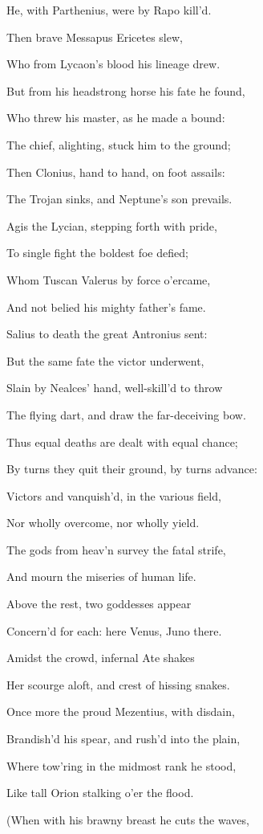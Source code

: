 He, with Parthenius, were by Rapo kill’d.

Then brave Messapus Ericetes slew,

Who from Lycaon’s blood his lineage drew.

But from his headstrong horse his fate he found,

Who threw his master, as he made a bound:

The chief, alighting, stuck him to the ground;

Then Clonius, hand to hand, on foot assails:

The Trojan sinks, and Neptune’s son prevails.

Agis the Lycian, stepping forth with pride,

To single fight the boldest foe defied;

Whom Tuscan Valerus by force o’ercame,

And not belied his mighty father’s fame.

Salius to death the great Antronius sent:

But the same fate the victor underwent,

Slain by Nealces’ hand, well-skill’d to throw

The flying dart, and draw the far-deceiving bow.

Thus equal deaths are dealt with equal chance;

By turns they quit their ground, by turns advance:

Victors and vanquish’d, in the various field,

Nor wholly overcome, nor wholly yield.

The gods from heav’n survey the fatal strife,

And mourn the miseries of human life.

Above the rest, two goddesses appear

Concern’d for each: here Venus, Juno there.

Amidst the crowd, infernal Ate shakes

Her scourge aloft, and crest of hissing snakes.

Once more the proud Mezentius, with disdain,

Brandish’d his spear, and rush’d into the plain,

Where tow’ring in the midmost rank he stood,

Like tall Orion stalking o’er the flood.

(When with his brawny breast he cuts the waves,


